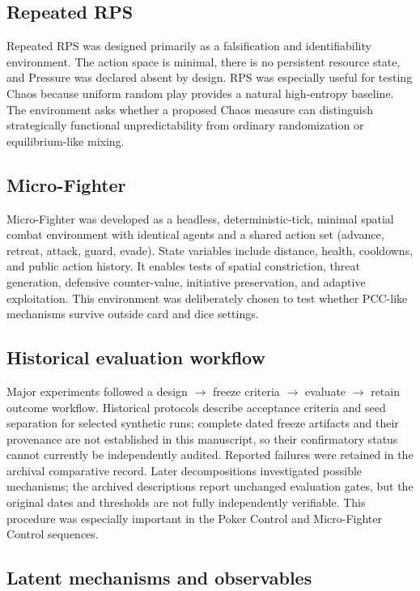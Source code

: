 \documentclass[journal]{IEEEtran}
\begin{document}
\subsection{Repeated RPS}

Repeated RPS was designed primarily as a falsification and identifiability environment. The action space is minimal, there is no persistent resource state, and Pressure was declared absent by design. RPS was especially useful for testing Chaos because uniform random play provides a natural high-entropy baseline. The environment asks whether a proposed Chaos measure can distinguish strategically functional unpredictability from ordinary randomization or equilibrium-like mixing.

\subsection{Micro-Fighter}

Micro-Fighter was developed as a headless, deterministic-tick, minimal spatial combat environment with identical agents and a shared action set (advance, retreat, attack, guard, evade). State variables include distance, health, cooldowns, and public action history. It enables tests of spatial constriction, threat generation, defensive counter-value, initiative preservation, and adaptive exploitation. This environment was deliberately chosen to test whether PCC-like mechanisms survive outside card and dice settings.

\subsection{Historical evaluation workflow}

Major experiments followed a design $\rightarrow$ freeze criteria $\rightarrow$ evaluate $\rightarrow$ retain outcome workflow. Historical protocols describe acceptance criteria and seed separation for selected synthetic runs; complete dated freeze artifacts and their provenance are not established in this manuscript, so their confirmatory status cannot currently be independently audited. Reported failures were retained in the archival comparative record. Later decompositions investigated possible mechanisms; the archived descriptions report unchanged evaluation gates, but the original dates and thresholds are not fully independently verifiable. This procedure was especially important in the Poker Control and Micro-Fighter Control sequences.

\subsection{Latent mechanisms and observables}
\end{document}
